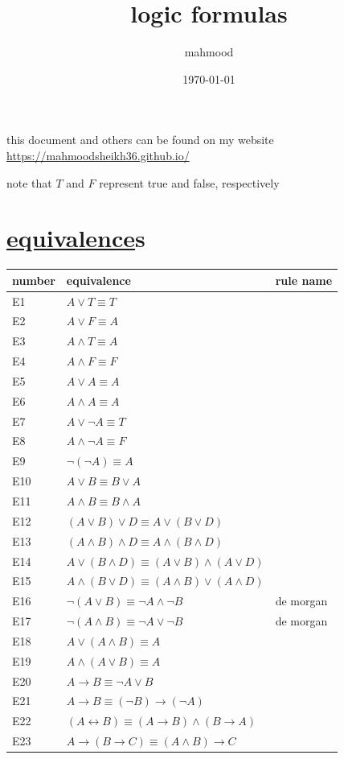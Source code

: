 \documentclass[a4paper,12pt]{article}
\author{mahmood}
\date{\today}
\title{logic formulas}
\begin{document}
\maketitle
\begin{note}
this document and others can be found on my website\\
\url{https://mahmoodsheikh36.github.io/}
\end{note}
note that \(T\) and \(F\) represent true and false, respectively\\
\section{\href{20230525090415-equivalence.org}{equivalence}s}
\label{sec:orga640cbb}
\begin{tabular}{lll}
number & equivalence & rule name\\
\hline
E1 & \(A \lor T \equiv T\) & \\
E2 & \(A \lor F \equiv A\) & \\
E3 & \(A \land T \equiv A\) & \\
E4 & \(A \land F \equiv F\) & \\
E5 & \(A \lor A \equiv A\) & \\
E6 & \(A \land A \equiv A\) & \\
E7 & \(A \lor \lnot A \equiv T\) & \\
E8 & \(A \land \lnot A \equiv F\) & \\
E9 & \(\lnot (\lnot A) \equiv A\) & \\
E10 & \(A \lor B \equiv B \lor A\) & \\
E11 & \(A \land B \equiv B \land A\) & \\
E12 & \((A \lor B) \lor D \equiv A \lor (B \lor D)\) & \\
E13 & \((A \land B) \land D \equiv A \land (B \land D)\) & \\
E14 & \(A \lor (B \land D) \equiv (A \lor B) \land (A \lor D)\) & \\
E15 & \(A \land (B \lor D) \equiv (A \land B) \lor (A \land D)\) & \\
E16 & \(\lnot (A \lor B) \equiv \lnot A \land \lnot B\) & de morgan\\
E17 & \(\lnot (A \land B) \equiv \lnot A \lor \lnot B\) & de morgan\\
E18 & \(A \lor (A \land B) \equiv A\) & \\
E19 & \(A \land (A \lor B) \equiv A\) & \\
E20 & \(A \to B \equiv \lnot A \lor B\) & \\
E21 & \(A \to B \equiv (\lnot B) \to (\lnot A)\) & \\
E22 & \((A \leftrightarrow B) \equiv (A \to B) \land (B \to A)\) & \\
E23 & \(A \to (B \to C) \equiv (A \land B) \to C\) & \\
\end{tabular}
\end{document}
